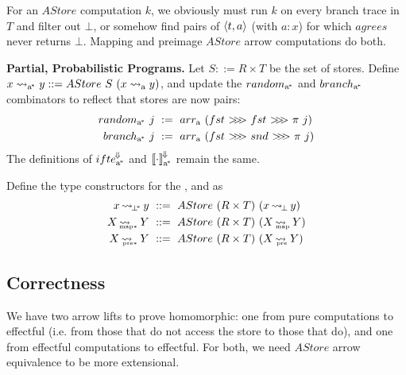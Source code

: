 \documentclass{llncs}
\renewcommand{\paragraph}[1]{\vspace{0.5\baselineskip}\noindent\textbf{{#1}.}\hspace{0.25\baselineskip}}
\newcommand{\arrow}{\rightsquigarrow}
\newcommand{\conv}{^{\mspace{-2mu}\Downarrow\mspace{-2mu}}}
\newcommand{\meaningofconv}[1]{\left\llbracket{#1}\right\rrbracket\conv}
\newcommand{\arrowarr}{\ensuremath{arr}}
\newcommand{\arrowcomp}{\ensuremath{{>}\mspace{-6mu}{>}\mspace{-6mu}{>}}}
\newcommand{\arrowconvif}{\ensuremath{ifte\conv}}
\newcommand{\gen}{_\mathrm{a}}
\newcommand{\genc}{_\mathrm{a^{\mspace{-2mu}*}}}
\DeclareMathOperator{\botto}{\arrow_{\mspace{-3mu}\bot}}
\newcommand{\map}{_\mathrm{map}}
\DeclareMathOperator{\mapto}{\arrow_{\mspace{-21mu}\map}}
\newcommand{\pre}{_\mathrm{pre}}
\DeclareMathOperator{\preto}{\arrow_{\mspace{-19mu}\pre}}
\newcommand{\pbot}{{\bot^{\mspace{-4mu}*}}}
\DeclareMathOperator{\pbotto}{\arrow_{\mspace{-3mu}\pbot}}
\DeclareMathOperator{\pmapto}{\arrow_{\mspace{-22mu}_{\mathrm{map*}}}}
\DeclareMathOperator{\ppreto}{\arrow_{\mspace{-19mu}_{\mathrm{pre*}}}}
\begin{document}
For an $AStore$ computation $k$, we obviously must run $k$ on every branch trace in $T$ and filter out $\bot$, or somehow find pairs of $\langle{t,a}\rangle$ (with $a : x$) for which $agrees$ never returns $\bot$.
Mapping and preimage $AStore$ arrow computations do both.

\paragraph{Partial, Probabilistic Programs}
Let $S ::= R \times T$ be the set of stores.
Define $x \arrow\genc y ::= AStore~S~(x \arrow\gen y)$, and update the $random\genc$ and $branch\genc$ combinators to reflect that stores are now pairs:
\begin{equation}
\begin{aligned}
	random\genc~j &\ := \ \arrowarr\gen~(fst~\arrowcomp~fst~\arrowcomp~\pi~j)
\\
	branch\genc~j &\ := \ \arrowarr\gen~(fst~\arrowcomp~snd~\arrowcomp~\pi~j)
\end{aligned}
\end{equation}
The definitions of $\arrowconvif\genc$ and $\meaningofconv{\cdot}\genc$ remain the same.

\begin{definition}
Define the type constructors for the ,  and  as
\begin{equation}
\begin{aligned}
	x \pbotto y &\ ::=\ AStore~(R \times T)~(x \botto y) \\
	X \pmapto Y &\ ::=\ AStore~(R \times T)~(X \mapto Y) \\
	X \ppreto Y &\ ::=\ AStore~(R \times T)~(X \preto Y) \\
\end{aligned}
\end{equation}
\end{definition}

\subsection{Correctness}

We have two arrow lifts to prove homomorphic: one from pure computations to effectful (i.e. from those that do not access the store to those that do), and one from effectful computations to effectful.
For both, we need $AStore$ arrow equivalence to be more extensional.
\end{document}
